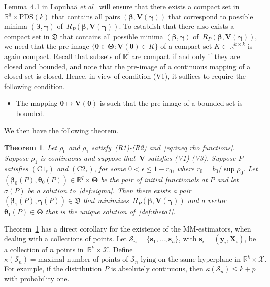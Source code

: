 \documentclass{article}
\numberwithin{equation}{section}
\theoremstyle{plain}
\newtheorem{theorem}{Theorem}
\newcommand{\R}{\mathbb{R}}
\newcommand{\bbeta}{\bm\beta}
\newcommand{\btheta}{\bm\theta}
\newcommand{\bgamma}{\bm\gamma}
\newcommand{\bTheta}{\bm\Theta}
\newcommand{\by}{\mathbf{y}}
\newcommand{\bs}{\mathbf{s}}
\newcommand{\bX}{\mathbf{X}}
\newcommand{\bV}{\mathbf{V}}
\begin{document}
Lemma~4.1 in Lopuha\"a \textit{et al}~\cite{lopuhaa-gares-ruizgazen2023} will ensure that there exists a compact set
in $\R^q\times\text{PDS}(k)$
that contains all pairs $(\bbeta,\bV(\bgamma))$ that correspond to possible minima
$(\bbeta,\bgamma)$ of~$R_P(\bbeta,\bV(\bgamma))$.
To establish that there also exists a compact set in $\mathfrak{D}$ that contains all 
possible minima $(\bbeta,\bgamma)$ of~$R_P(\bbeta,\bV(\bgamma))$,
we need that the pre-image
$\{\btheta\in\bTheta: \bV(\btheta)\in K\}$ of a compact set $K\subset\R^{k\times k}$ is again compact.
Recall that subsets of $\R^l$ are compact if and only if they are closed and bounded,
and note that the pre-image of a continuous mapping of a closed set is closed.
Hence, in view of condition (V1), it suffices to require the following condition.
\begin{itemize}
\item[(V3)]
The mapping $\btheta\mapsto \bV(\btheta)$ is such that the pre-image of a bounded set is bounded.
\end{itemize}
We then have the following theorem.
\begin{theorem}
\label{th:existence}
Let $\rho_0$ and $\rho_1$ satisfy~(R1)-(R2) and~\eqref{eq:ineq rho functions}.
Suppose $\rho_1$ is continuous and suppose that~$\bV$ satisfies (V1)-(V3).
Suppose $P$ satisfies $(\text{C1}_\epsilon)$ and $(\text{C2}_\epsilon)$, for some $0<\epsilon\leq 1-r_0$,
where $r_0=b_0/\sup\rho_0$. 
Let $(\bbeta_0(P),\btheta_0(P))\in\R^{q}\times\bTheta$ be the pair of initial functionals at $P$
and let $\sigma(P)$ be a solution to~\eqref{def:sigma}.
Then there exists a pair $(\bbeta_1(P),\bgamma(P))\in \mathfrak{D}$
that minimizes~$R_P(\bbeta,\bV(\bgamma))$
and a vector~$\btheta_1(P)\in\bTheta$ that is the unique solution of~\eqref{def:theta1}.
\end{theorem}
Theorem~\ref{th:existence} has a direct corollary for the existence of the MM-estimators, when dealing with a collections of points.
Let $\mathcal{S}_n=\{\bs_1,\ldots,\bs_n\}$, with $\bs_i=(\by_i,\bX_i)$, be a collection of $n$ points
in~$\R^k\times \mathcal{X}$.
Define
\begin{equation}
\label{def:k(S)}
\kappa(\mathcal{S}_n)
=
\text{maximal number of points of $\mathcal{S}_n$ lying on the same hyperplane in~$\R^k\times \mathcal{X}$.}
\end{equation}
For example, if the distribution $P$ is absolutely continuous, then
$\kappa(\mathcal{S}_n)\leq k+p$ with probability one.
\end{document}
